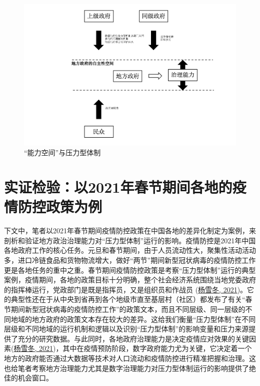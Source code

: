 \documentclass[
  12pt,
]{ctexart}
\begin{document}
\begin{figure}
\includegraphics[width=1\linewidth]{../figures/figure2} \caption{“能力空间”与压力型体制}\label{fig:unnamed-chunk-1}
\end{figure}

\hypertarget{ux5b9eux8bc1ux68c0ux9a8cux4ee52021ux5e74ux6625ux8282ux671fux95f4ux5404ux5730ux7684ux75abux60c5ux9632ux63a7ux653fux7b56ux4e3aux4f8b}{%
\section{实证检验：以2021年春节期间各地的疫情防控政策为例}\label{ux5b9eux8bc1ux68c0ux9a8cux4ee52021ux5e74ux6625ux8282ux671fux95f4ux5404ux5730ux7684ux75abux60c5ux9632ux63a7ux653fux7b56ux4e3aux4f8b}}

下文中，笔者以2021年春节期间疫情防控政策在中国各地的差异化制定为案例，来剖析和验证地方政治治理能力对``压力型体制''运行的影响。疫情防控是2021年中国各地政府工作的核心任务。元旦和春节期间，由于人员流动性大，聚集性活动活动多，进口冷链食品和货物物流增大，做好``两节''期间新型冠状病毒的疫情防控工作更是各地任务的重中之重。春节期间疫情防控政策是考察``压力型体制''运行的典型案例，疫情期间，各地的政策目标十分明确，整个社会经济系统围绕当地党委政府的指挥棒运行，党政部门是既是指挥员，又是组织员和作战员 (\protect\hyperlink{ref-YangXueDong2021}{杨雪冬, 2021})。它的典型性还在于从中央到省再到各个地级市直至基层村（社区）都发布了有关``春节期间新型冠状病毒的疫情防控工作''的政策文本，而且不同层级、同一层级的不同地域的地方政府的政策文本存在较大的差异。这给我们衡量``压力型体制''在不同层级和不同地域的运行机制和逻辑以及识别``压力型体制''的影响变量和压力来源提供了充分的研究数据。与此同时，各地政府治理能力是决定疫情应对效果的关键因素(\protect\hyperlink{ref-YangXueDong2021}{杨雪冬, 2021})，其中在疫情预防阶段，数字政府能力尤为关键，它决定着一个地方的政府能否通过大数据等技术对人口流动和疫情防控进行精准把握和治理。这也给笔者考察地方治理能力尤其是数字治理能力对压力型体制运行的影响提供了绝佳的机会窗口。
\end{document}
